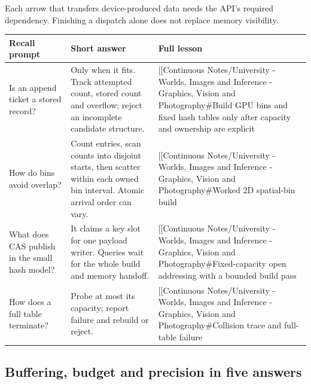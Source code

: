 Each arrow that transfers device-produced data needs the API's required dependency. Finishing a dispatch alone does not replace memory visibility.

{\def\LTcaptype{none} %
\begin{longtable}[]{@{}
  >{\raggedright\arraybackslash}p{}
  >{\raggedright\arraybackslash}p{}
  >{\raggedright\arraybackslash}p{}@{}}
\toprule\noalign{}
\begin{minipage}[b]{\linewidth}\raggedright
Recall prompt
\end{minipage} & \begin{minipage}[b]{\linewidth}\raggedright
Short answer
\end{minipage} & \begin{minipage}[b]{\linewidth}\raggedright
Full lesson
\end{minipage} \\
\midrule\noalign{}
\endhead
\bottomrule\noalign{}
\endlastfoot
Is an append ticket a stored record? & Only when it fits. Track attempted count, stored count and overflow; reject an incomplete candidate structure. & {[}{[}Continuous Notes/University - Worlds, Images and Inference - Graphics, Vision and Photography\#Build GPU bins and fixed hash tables only after capacity and ownership are explicit \\
How do bins avoid overlap? & Count entries, scan counts into disjoint starts, then scatter within each owned bin interval. Atomic arrival order can vary. & {[}{[}Continuous Notes/University - Worlds, Images and Inference - Graphics, Vision and Photography\#Worked 2D spatial-bin build \\
What does CAS publish in the small hash model? & It claims a key slot for one payload writer. Queries wait for the whole build and memory handoff. & {[}{[}Continuous Notes/University - Worlds, Images and Inference - Graphics, Vision and Photography\#Fixed-capacity open addressing with a bounded build pass \\
How does a full table terminate? & Probe at most its capacity; report failure and rebuild or reject. & {[}{[}Continuous Notes/University - Worlds, Images and Inference - Graphics, Vision and Photography\#Collision trace and full-table failure \\
\end{longtable}
}

\subsection{Buffering, budget and precision in five answers}\label{buffering-budget-and-precision-in-five-answers}


